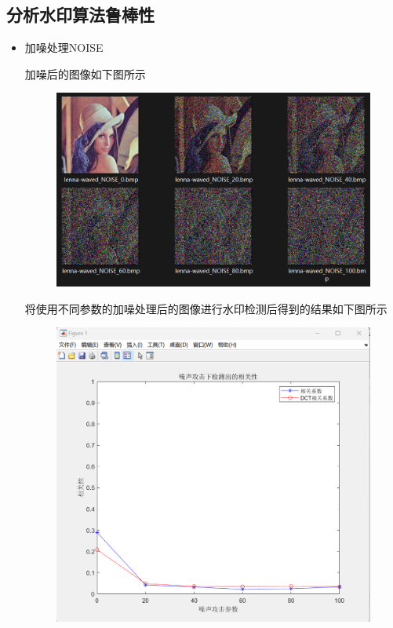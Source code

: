 \documentclass[a4paper,11pt,UTF8]{ctexart}
\newcommand{\bottomcaption}{%
\setlength{\abovecaptionskip}{6pt}%
\setlength{\belowcaptionskip}{6pt}%
\caption}
\newcommand{\xiaowuhao}{\fontsize{9pt}{\baselineskip}\selectfont}   %
\begin{document}
\begin{itemize}
\begin{figure}[H]
          \bottomcaption{\xiaowuhao{强度因子-相关性关系}}
        \end{figure}
    \end{itemize}
  \subsection{分析水印算法鲁棒性}
    \begin{itemize}
      \item 加噪处理NOISE\par
        加噪后的图像如下图所示
        \begin{figure}[H]
          \centering
          \includegraphics[width=11cm]{imgs_noise.png}
          \bottomcaption{\xiaowuhao{加噪处理后的图像}}
        \end{figure}
\newpage
        将使用不同参数的加噪处理后的图像进行水印检测后得到的结果如下图所示
        \begin{figure}[H]
          \centering
          \includegraphics[width=11cm]{attack_noise.png}
          \bottomcaption{\xiaowuhao{加噪处理后的相关性}}
        \end{figure}
        

\end{itemize}
\end{document}
